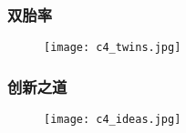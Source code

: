 \begin{frame}
  \frametitle{双胎率}
  \begin{figure}
    \centering
    \texttt{[image: c4\_twins.jpg]}
  \end{figure}
\end{frame}

\begin{frame}
  \frametitle{创新之道}
  \begin{figure}
    \centering
    \texttt{[image: c4\_ideas.jpg]}
  \end{figure}
\end{frame}




